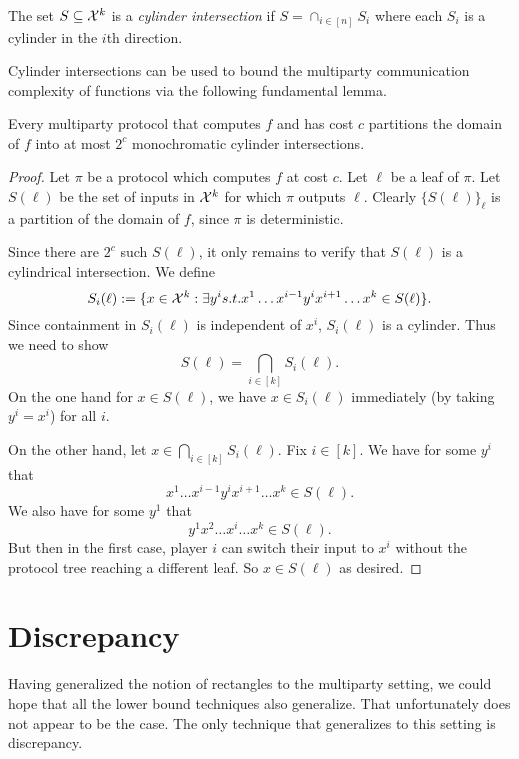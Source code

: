 \begin{definition}
The set $S \subseteq \mathcal{X}^k$ is a \emph{cylinder intersection} if $S = \cap_{i \in [n]} S_i$ where each $S_i$ is a cylinder in the $i$th direction.
\end{definition}

Cylinder intersections can be used to bound the multiparty communication complexity of functions via the following fundamental lemma.

\begin{lemma}
Every multiparty protocol that computes $f$ and has cost $c$ partitions the domain of $f$ into at most $2^c$ monochromatic cylinder intersections.
\end{lemma}

\begin{proof}
Let $\pi$ be a protocol which computes $f$ at cost $c$. Let $\ell$ be a leaf of $\pi$. Let $S(\ell)$ be the set of inputs in $\mathcal{X}^k$ for which $\pi$ outputs $\ell$. Clearly $\{S(\ell)\}_\ell$ is a partition of the domain of $f$, since $\pi$ is deterministic.

Since there are $2^c$ such $S(\ell)$, it only remains to verify that $S(\ell)$ is a cylindrical intersection. We define
$$S_i(\ell):=\{x \in \mathcal{X}^k: \exists y^i s.t. x^1\dots x^{i-1}y^ix^{i+1}\dots x^k \in S(\ell)\}.$$
Since containment in $S_i(\ell)$ is independent of $x^i$, $S_i(\ell)$ is a cylinder. Thus we need to show
$$S(\ell) = \bigcap_{i\in[k]} S_i(\ell).$$
On the one hand for $x\in S(\ell)$, we have $x\in S_i(\ell)$ immediately (by taking $y^i = x^i$) for all $i$. 

On the other hand, let $x \in \bigcap_{i\in [k]} S_i(\ell).$ Fix $i\in[k]$. We have for some $y^i$ that
$$x^1\dots x^{i-1}y^ix^{i+1}\dots x^k \in S(\ell).$$
We also have for some $y^1$ that
$$y^1x^2\dots x^i\dots x^k\in S(\ell).$$
But then in the first case, player $i$ can switch their input to $x^i$ without the protocol tree reaching a different leaf. So $x \in S(\ell)$ as desired.
\end{proof}



\newpage 
\section{Discrepancy}

Having generalized the notion of rectangles to the multiparty setting, we could hope that all the lower bound techniques also generalize. That unfortunately does not appear to be the case. The only technique that generalizes to this setting is discrepancy.

